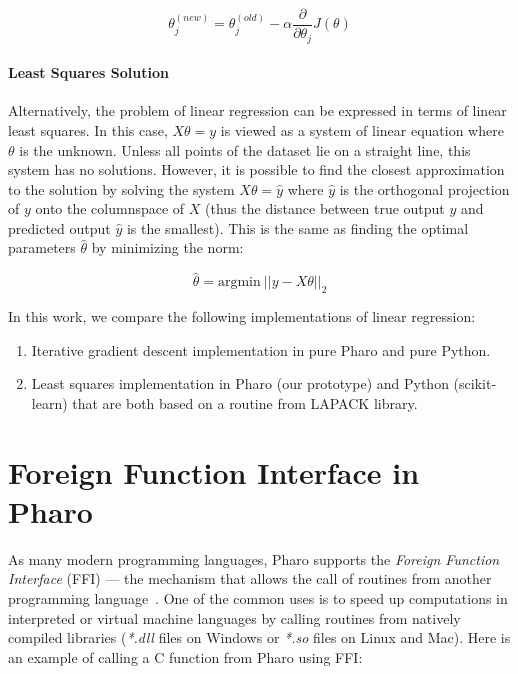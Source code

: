 \documentclass[]{ceurart}
\begin{document}
\[ \theta_j^{(new)} = \theta_j^{(old)} - \alpha \frac{\partial}{\partial \theta_j} J(\theta) \]

\paragraph{Least Squares Solution}

Alternatively, the problem of linear regression can be expressed in terms of linear least squares.
In this case, $X\theta = y$ is viewed as a system of linear equation where $\theta$ is the unknown.
Unless all points of the dataset lie on a straight line, this system has no solutions.
However, it is possible to find the closest approximation to the solution by solving the system $X\theta = \hat y$ where $\hat y$ is the orthogonal projection of $y$ onto the columnspace of $X$ (thus the distance between true output $y$ and predicted output $\hat y$ is the smallest).
This is the same as finding the optimal parameters $\hat \theta$ by minimizing the norm:

\[ \hat \theta = \text{argmin}\ \big|\big| y - X\theta \big|\big|_2 \]

In this work, we compare the following implementations of linear regression:

\begin{enumerate}
  \item Iterative gradient descent implementation in pure Pharo and pure Python.
  \item Least squares implementation in Pharo (our prototype) and Python (scikit-learn) that are both based on a routine from LAPACK library.
\end{enumerate}



\section{Foreign Function Interface in Pharo}
\label{sec:FFI}

As many modern programming languages, Pharo supports the \emph{Foreign Function Interface} (FFI) --- the mechanism that allows the call of routines from another programming language~\cite{Poli20z}.
One of the common uses is to speed up computations in interpreted or virtual machine languages by calling routines from natively compiled libraries (\eg \emph{*.dll} files on Windows or \emph{*.so} files on Linux and Mac).
Here is an example of calling a C function  from Pharo using FFI:
\end{document}
